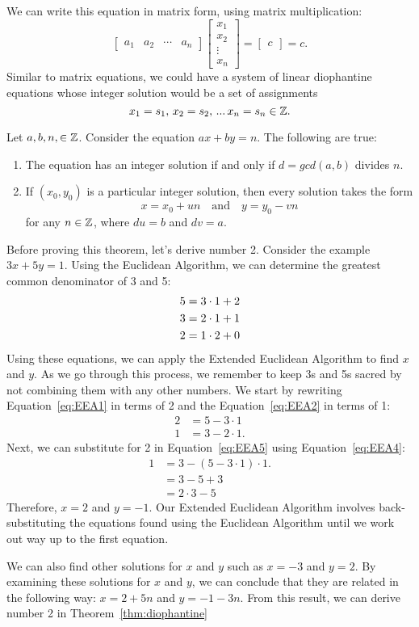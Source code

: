 We can write this equation in  matrix form, using matrix multiplication:
$$\begin{bmatrix}
a_1 & a_2 & \cdots & a_n
\end{bmatrix}
\begin{bmatrix}
x_1 \\
x_2 \\
\vdots\\
x_n
\end{bmatrix}
=
\begin{bmatrix}
c
\end{bmatrix}
= c.$$
Similar to matrix equations, we could have a system of linear diophantine equations whose integer solution would be a set of assignments $$x_1 = s_1, \, x_2 = s_2, \, ... \, x_n = s_n \in \mathbb{Z}.$$

\begin{theorem}\label{thm:diophantine}
Let $a, b, n, \in \mathbb{Z}$. Consider the equation $ax + by = n$. The following are true:
\begin{enumerate}
\item The equation has an integer solution if and only if $d = gcd(a,b)$ divides $n$.
\item If $(x_0,y_0)$ is a particular integer solution, then every solution takes the form \[x = x_0 + un \quad \text{and} \quad y = y_0 - vn\] for any $n \in \mathbb{Z}$, where $du = b$ and $dv = a$. 
\end{enumerate}
\end{theorem}
Before proving this theorem, let's derive number 2. Consider the example $3x + 5y = 1$. Using the Euclidean Algorithm, we can determine the greatest common denominator of 3 and 5:
\begin{align}
5 &= 3 \cdot 1 + 2 \label{eq:EEA1}\\
3 &= 2 \cdot 1 + 1 \label{eq:EEA2}\\
2 &= 1 \cdot 2 + 0 \notag
\end{align}
Using these equations, we can apply the Extended Euclidean Algorithm to find $x$ and $y$. As we go through this process, we remember to keep 3s and 5s sacred by not combining them with any other numbers. We start by rewriting Equation~\eqref{eq:EEA1} in terms of 2 and the Equation~\eqref{eq:EEA2} in terms of 1: 
\begin{align}
2 &= 5 - 3 \cdot 1 \label{eq:EEA4}\\
1 &= 3 - 2 \cdot 1. \label{eq:EEA5} 
\end{align}
Next, we can substitute for 2 in Equation~\eqref{eq:EEA5} using Equation~\eqref{eq:EEA4}:
\begin{align}
1 &= 3 - (5 - 3 \cdot 1) \cdot 1. \\
  &= 3 - 5 + 3 \\ 
  &= 2 \cdot 3 - 5
\end{align}
Therefore, $x=2$ and $y=-1$. Our Extended Euclidean Algorithm involves back-substituting the equations found using the Euclidean Algorithm until we work out way up to the first equation.

We can also find other solutions for $x$ and $y$ such as $x = -3$ and $y = 2$. By examining these solutions for $x$ and $y$, we can conclude that they are related in the following way: $x = 2 + 5n$ and $y = -1 - 3n$. From this result, we can derive number 2 in Theorem~\ref{thm:diophantine}